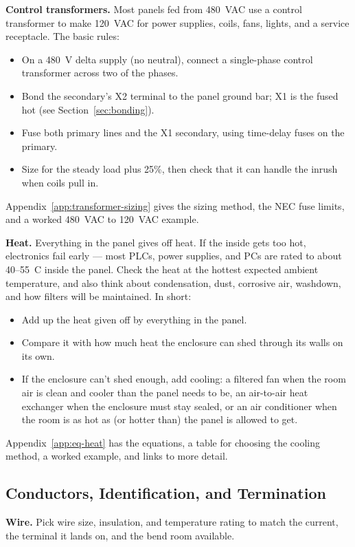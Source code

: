 \textbf{Control transformers.} Most panels fed from 480~VAC use a control transformer to make 120~VAC for power supplies, coils, fans, lights, and a service receptacle. The basic rules:
\begin{itemize}[itemsep=1pt]
  \item On a 480~V delta supply (no neutral), connect a single-phase control transformer across two of the phases.
  \item Bond the secondary's X2 terminal to the panel ground bar; X1 is the fused hot (see Section~\ref{sec:bonding}).
  \item Fuse both primary lines and the X1 secondary, using time-delay fuses on the primary.
  \item Size for the steady load plus 25\%, then check that it can handle the inrush when coils pull in.
\end{itemize}
Appendix~\ref{app:transformer-sizing} gives the sizing method, the NEC fuse limits, and a worked 480~VAC to 120~VAC example.

\textbf{Heat.} Everything in the panel gives off heat. If the inside gets too hot, electronics fail early --- most PLCs, power supplies, and PCs are rated to about 40--55~\textdegree C inside the panel. Check the heat at the hottest expected ambient temperature, and also think about condensation, dust, corrosive air, washdown, and how filters will be maintained. In short:
\begin{itemize}[itemsep=1pt]
  \item Add up the heat given off by everything in the panel.
  \item Compare it with how much heat the enclosure can shed through its walls on its own.
  \item If the enclosure can't shed enough, add cooling: a filtered fan when the room air is clean and cooler than the panel needs to be, an air-to-air heat exchanger when the enclosure must stay sealed, or an air conditioner when the room is as hot as (or hotter than) the panel is allowed to get.
\end{itemize}
Appendix~\ref{app:eq-heat} has the equations, a table for choosing the cooling method, a worked example, and links to more detail.

\subsection{Conductors, Identification, and Termination}
\textbf{Wire.} Pick wire size, insulation, and temperature rating to match the current, the terminal it lands on, and the bend room available.

